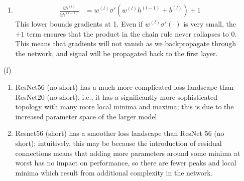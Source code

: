 \documentclass{article}
\newcommand{\pd}[2]{\frac{\partial #1}{\partial #2}}
\begin{document}
\begin{itemize}
\begin{enumerate}
        \item \begin{align*}
            \pd{h^{(l)}}{h^{(l-1)}} &= w^{(l)}  \sigma'(w^{(l)}h^{(l-1)} + b^{(l)}) + 1
        \end{align*}
        This lower bounds gradients at 1. Even if $w^{(l)} \sigma'(\cdot)$ is very small, the $+1$ term ensures that the product in the chain rule never collapses to 0. This means that gradients will not vanish as we backpropagate through the network, and signal will be propagated back to the first layer.
    \end{enumerate}
    \item[(f)] \begin{enumerate}
        \item ResNet56 (no short) has a much more complicated loss landscape than ResNet20 (no short), i.e., it has a significantly more sophisticated topology with many more local minima and maxima; this is due to the increased parameter space of the larger model
        \item Resnet56 (short) has a smoother loss landscape than ResNet 56 (no short); intuitively, this may be because the introduction of residual connections means that adding more parameters around some minima at worst has no impact on performance, so there are fewer peaks and local minima which result from additional complexity in the network.
    \end{enumerate}
\end{itemize}

\newpage
\end{document}
